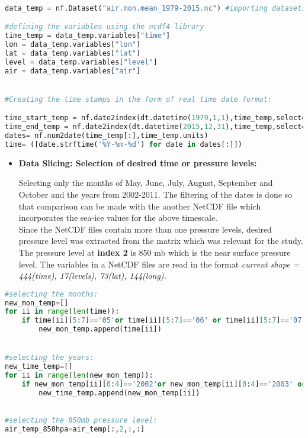 \documentclass{article} %
\begin{document}
\begin{lstlisting}[language=Python, caption=Reading variables in NetCDF]

data_temp = nf.Dataset("air.mon.mean_1979-2015.nc") #importing datasets using netcdf

#defining the variables using the ncdf4 library
time_temp = data_temp.variables["time"]
lon = data_temp.variables["lon"]
lat = data_temp.variables["lat"]
level = data_temp.variables["level"]
air = data_temp.variables["air"]


#Creating the time stamps in the form of real time date format: 

time_start_temp = nf.date2index(dt.datetime(1979,1,1),time_temp,select="nearest")
time_end_temp = nf.date2index(dt.datetime(2015,12,31),time_temp,select="nearest")
dates= nf.num2date(time_temp[:],time_temp.units)
time= ([date.strftime('%Y-%m-%d') for date in dates[:]])

\end{lstlisting}

\begin{itemize}
    \item {\bf Data Slicing: Selection of desired time or pressure levels:}
    
    Selecting only the months of May, June, July, August, September and October and the years from 2002-2011. The filtering of the dates is done so that comparison can be made with the another NetCDF file which incorporates the sea-ice values for the above timescale.\\
    
   Since the NetCDF files contain more than one pressure levels, desired pressure level was extracted from the matrix which was relevant for the study. The pressure level at {\bf index 2} is 850 mb which is the near surface pressure level. The variables in  a NetCDF files are read in the format {\it current shape = 444(time), 17(levels), 73(lat), 144(long).}
    
    \end{itemize}


\begin{lstlisting}[language=Python, caption=Data Slicing (using temperature dataset)]
#selecting the months:
new_mon_temp=[]
for ii in range(len(time)):
    if time[ii][5:7]=='05'or time[ii][5:7]=='06' or time[ii][5:7]=='07' or time[ii][5:7]=='08' or time[ii][5:7]=='09' or time[ii][5:7]=='10':
        new_mon_temp.append(time[ii])


#selecting the years:
new_time_temp=[]
for ii in range(len(new_mon_temp)):
    if new_mon_temp[ii][0:4]=='2002'or new_mon_temp[ii][0:4]=='2003' or new_mon_temp[ii][0:4]=='2004' or new_mon_temp[ii][0:4]=='2005' or new_mon_temp[ii][0:4]=='2006' or new_mon_temp[ii][0:4]=='2007' or new_mon_temp[ii][0:4]=='2008' or new_mon_temp[ii][0:4]=='2009' or new_mon_temp[ii][0:4]=='2010' or new_mon_temp[ii][0:4]=='2011':
        new_time_temp.append(new_mon_temp[ii])
        

#selecting the 850mb pressure level:
air_temp_850hpa=air_temp[:,2,:,:]

\end{lstlisting}
\end{document}
